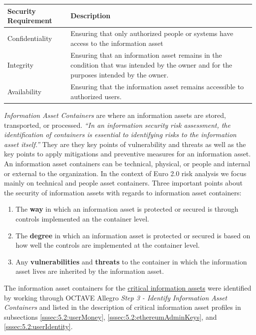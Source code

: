 \documentclass[a4paper,12pt]{article} %
\begin{document}
{\begin{center}
\begin{tabular}{ | l | p{10.5cm} | }
  \hline
  \textbf{Security Requirement} & \textbf{Description}
  \\ \hline
  Confidentiality & Ensuring that only authorized people or systems have access to the information asset
  \\ \hline
  Integrity & Ensuring that an information asset remains in the condition that was intended by the owner and for the purposes intended by the owner.
  \\ \hline
  Availability & Ensuring that the information asset remains accessible to authorized users.
  \\ \hline
\end{tabular}
\end{center}
\label{tab:securityRequirements}

\textit{Information Asset Containers} are where an information assets are stored, transported, or processed. \textit{``In an information security risk assessment, the identification of containers is essential to identifying risks to the information asset itself.''} They are they key points of vulnerability and threats as well as the key points to apply mitigations and preventive measures for an information asset. An information asset containers can be technical, physical, or people and internal or external to the organization.  In the context of Euro 2.0 risk analysis we focus mainly on technical and people asset containers. Three important points about the security of information assets with regards to information asset containers:

\begin{enumerate}
	\item The \textbf{way} in which an information asset is protected or secured is through controls implemented an the container level.
	\item The \textbf{degree} in which an information asset is protected or secured is based on how well the controls are implemented at the container level.
	\item Any \textbf{vulnerabilities} and \textbf{threats} to the container in which the information asset lives are inherited by the information asset.
\end{enumerate}

The information asset containers for the \hyperref[enum:criticalInformationAssets]{critical information assets} were identified by working through OCTAVE Allegro \textit{Step 3 - Identify Information Asset Containers} and listed in the description of critical information asset profiles in subsections \ref{sssec:5.2:userMoney}, \ref{sssec:5.2:ethereumAdminKeys}, and \ref{sssec:5.2:userIdentity}.

}
\end{document}
